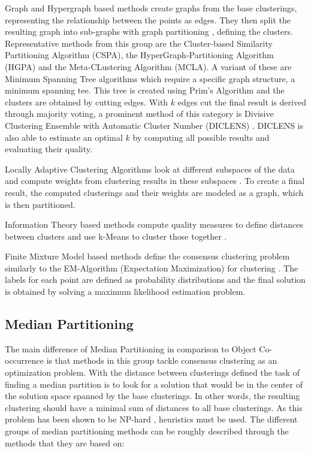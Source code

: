 \documentclass[
	a4paper,
	english,
	twoside,
	openright,               
	11pt                            
	]{report}
\begin{document}
Graph and Hypergraph based methods create graphs from the base clusterings, representing the relationship between the points as edges. They then split the resulting graph into sub-graphs with graph partitioning \cite{Strehl:2003:CEK:944919.944935}, defining the clusters. Representative methods from this group are the Cluster-based Similarity Partitioning Algorithm (CSPA), the HyperGraph-Partitioning Algorithm (HGPA) and the Meta-CLustering Algorithm (MCLA). A variant of these are Minimum Spanning Tree algorithms which require a specific graph structure, a minimum spanning tee. This tree is created using Prim's Algorithm \cite[p.~276]{10.1007/978-3-540-85033-5_27} and the clusters are obtained by cutting edges. With $k$ edges cut the final result is derived through majority voting, a prominent method of this category is Divisive Clustering Ensemble with Automatic Cluster Number (DICLENS) \cite{6035671}. DICLENS is also able to estimate an optimal $k$ by computing all possible results and evaluating their quality.

Locally Adaptive Clustering Algorithms look at different subspaces of the data and compute weights from clustering results in these subspaces \cite{Domeniconi2007}. To create a final result, the computed clusterings and their weights are modeled as a graph, which is then partitioned.

Information Theory based methods compute quality measures to define distances between clusters and use k-Means to cluster those together \cite[p.~353]{survey1}.

Finite Mixture Model based methods define the consensus clustering problem similarly to the EM-Algorithm (Expectation Maximization) for clustering \cite{Goder2008ConsensusCA,Topchy2004AMM}. The labels for each point are defined as  probability distributions and the final solution is obtained by solving a maximum likelihood estimation problem.

\subsection{Median Partitioning}
The main difference of Median Partitioning in comparison to Object Co-occurrence is that methods in this group tackle consensus clustering as an optimization problem. With the distance between clusterings defined the task of finding a median partition is to look for a solution that would be in the center of the solution space spanned by the base clusterings. In other words, the resulting clustering should have a minimal sum of distances to all base clusterings. As this problem has been shown to be NP-hard \cite{np_median_partition}, heuristics must be used. The different groups of median partitioning methods can be roughly described through the methods that they are based on:
\end{document}
